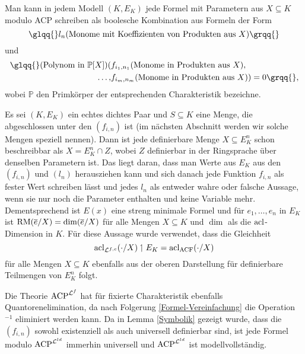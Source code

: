     \begin{corollary}\label{Formel-Vereinfachung}
    	Man kann in jedem Modell $(K,E_K)$ jede Formel mit Parametern aus $X\subseteq K$ modulo ACP schreiben als boolesche Kombination aus Formeln der Form $$\glqq{}l_n(\text{Monome mit Koeffizienten von Produkten aus }X)\grqq{}$$ und
    	\begin{align*}
    	\text{\glqq{}}(\text{Polynom in }\mathbb{P}[X])(&f_{i_1,n_1}(\text{Monome in Produkten aus }X),\\\dots,&f_{i_m,n_m}(\text{Monome in Produkten aus }X))=0\grqq{},
    	\end{align*}
        wobei $\mathbb{P}$ den Primkörper der entsprechenden Charakteristik bezeichne.
    \end{corollary}
    \begin{corollary}
    	Es sei $(K,E_K)$ ein echtes dichtes Paar und $S\subseteq K$ eine Menge, die abgeschlossen unter den $(f_{i,n})$ ist (im nächsten Abschnitt werden wir solche Mengen speziell nennen). Dann ist jede definierbare Menge $X\subseteq E_K^n$ schon beschreibbar als $X=E_K^n\cap Z$, wobei $Z$ definierbar in der Ringsprache über denselben Parametern ist. Das liegt daran, dass man Werte aus $E_K$ aus den $(f_{i,n})$ und $(l_n)$ herausziehen kann und sich danach jede Funktion $f_{i,n}$ als fester Wert schreiben lässt und jedes $l_n$ als entweder wahre oder falsche Aussage, wenn sie nur noch die Parameter enthalten und keine Variable mehr.\\ Dementsprechend ist $E(x)$ eine streng minimale Formel und für $e_1,\dots,e_n$ in $E_K$ ist $\operatorname{RM}(\overline{e}/X)=\dim(\overline{e}/X)$ für alle Mengen $X\subseteq K$ und $\dim$ als die $\operatorname{acl}$-Dimension in $K$. Für diese Aussage wurde verwendet, dass die Gleichheit $$\operatorname{acl}_{\mathcal{L}^{f,c}}(\cdot/X)\upharpoonleft E_K=\operatorname{acl}_{\operatorname{ACF}}(\cdot/X)$$ für alle Mengen $X\subseteq K$ ebenfalls aus der oberen Darstellung für definierbare Teilmengen von $E_K^n$ folgt.
    \end{corollary}
    \begin{corollary}
    	Die Theorie $\operatorname{ACP}^{\mathcal{L}^f}$ hat für fixierte Charakteristik ebenfalls Quantorenelimination, da nach Folgerung \ref{Formel-Vereinfachung} die Operation \glqq{}$^{-1}$\grqq{} eliminiert werden kann. Da in Lemma \ref{Symbolik} gezeigt wurde, dass die $(f_{i,n})$ sowohl existenziell als auch universell definierbar sind, ist jede Formel modulo $\operatorname{ACP}^{\mathcal{L}^{ld}}$ immerhin universell und $\operatorname{ACP}^{\mathcal{L}^{ld}}$ ist modellvollständig.
    \end{corollary}
